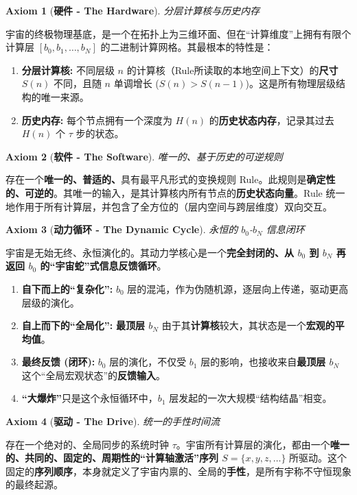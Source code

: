 \documentclass[11pt, a4paper]{article}
\newtheorem{axiom}{Axiom}[section]
\begin{document}
\begin{axiom}[\textbf{硬件 - The Hardware}]
分层计算核与历史内存
\end{axiom}
宇宙的终极物理基底，是一个在拓扑上为三维环面、但在“计算维度”上拥有有限个计算层 $[b_0, b_1, \dots, b_N]$ 的二进制计算网格。其最根本的特性是：
\begin{enumerate}
    \item \textbf{分层计算核:} 不同层级 $n$ 的计算核（Rule所读取的本地空间上下文）的\textbf{尺寸 $S(n)$} 不同，且随 $n$ 单调增长 ($S(n) > S(n-1)$)。这是所有物理层级结构的唯一来源。
    \item \textbf{历史内存:} 每个节点拥有一个深度为 $H(n)$ 的\textbf{历史状态内存}，记录其过去 $H(n)$ 个 $\tau$ 步的状态。
\end{enumerate}

\begin{axiom}[\textbf{软件 - The Software}]
唯一的、基于历史的可逆规则
\end{axiom}
存在一个\textbf{唯一的、普适的、}具有最平凡形式的变换规则 Rule。此规则是\textbf{确定性的、可逆的}。其唯一的输入，是其计算核内所有节点的\textbf{历史状态向量}。Rule 统一地作用于所有计算层，并包含了全方位的（层内空间与跨层维度）双向交互。

\begin{axiom}[\textbf{动力循环 - The Dynamic Cycle}]
永恒的 $b_0$-$b_N$ 信息闭环
\end{axiom}
宇宙是无始无终、永恒演化的。其动力学核心是一个\textbf{完全封闭的、从 $b_0$ 到 $b_N$ 再返回 $b_0$ 的“宇宙蛇”式信息反馈循环}。
\begin{enumerate}
    \item \textbf{自下而上的“复杂化”:} $b_0$ 层的混沌，作为伪随机源，逐层向上传递，驱动更高层级的演化。
    \item \textbf{自上而下的“全局化”:} \textbf{最顶层 $b_N$} 由于其\textbf{计算核}较大，其状态是一个\textbf{宏观的平均值}。
    \item \textbf{最终反馈 (闭环):} $b_0$ 层的演化，不仅受 $b_1$ 层的影响，也接收来自\textbf{最顶层 $b_N$} 这个“全局宏观状态”的\textbf{反馈输入}。
    \item \textbf{“大爆炸”}只是这个永恒循环中，$b_1$ 层发起的一次大规模“结构结晶”相变。
\end{enumerate}

\begin{axiom}[\textbf{驱动 - The Drive}]
统一的手性时间流
\end{axiom}
存在一个绝对的、全局同步的系统时钟 $\tau$。宇宙所有计算层的演化，都由一个\textbf{唯一的、共同的、固定的、周期性的“计算轴激活”序列 $S = \{x, y, z, \dots\}$} 所驱动。这个固定的\textbf{序列顺序}，本身就定义了宇宙内禀的、全局的\textbf{手性}，是所有宇称不守恒现象的最终起源。
\end{document}
